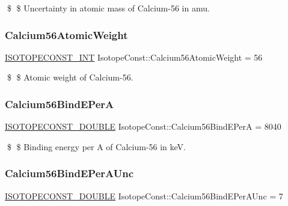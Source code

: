 \$ \$ Uncertainty in atomic mass of Calcium-\/56 in amu. \mbox{\label{group___isotope_const-_calcium-_ca56_ga0a9504d114df0c5ea1c232a277704442}} 
\subsubsection{\texorpdfstring{Calcium56\+Atomic\+Weight}{Calcium56AtomicWeight}}
{\footnotesize\ttfamily \mbox{\hyperlink{group___isotope_const-_macros_ga5f18360b3e99483a35c32d789e62621c}{I\+S\+O\+T\+O\+P\+E\+C\+O\+N\+S\+T\+\_\+\+I\+NT}} Isotope\+Const\+::\+Calcium56\+Atomic\+Weight = 56}

\$ \$ Atomic weight of Calcium-\/56. \mbox{\label{group___isotope_const-_calcium-_ca56_ga6b3adbbc83c3683d8bab47c847dbf985}} 
\subsubsection{\texorpdfstring{Calcium56\+Bind\+E\+PerA}{Calcium56BindEPerA}}
{\footnotesize\ttfamily \mbox{\hyperlink{group___isotope_const-_macros_ga8f45a7272ce02c0b4c65c44636ed719a}{I\+S\+O\+T\+O\+P\+E\+C\+O\+N\+S\+T\+\_\+\+D\+O\+U\+B\+LE}} Isotope\+Const\+::\+Calcium56\+Bind\+E\+PerA = 8040}

\$ \$ Binding energy per A of Calcium-\/56 in keV. \mbox{\label{group___isotope_const-_calcium-_ca56_ga5b426b4ff0e88a3c4710fc9dce39acc3}} 
\subsubsection{\texorpdfstring{Calcium56\+Bind\+E\+Per\+A\+Unc}{Calcium56BindEPerAUnc}}
{\footnotesize\ttfamily \mbox{\hyperlink{group___isotope_const-_macros_ga8f45a7272ce02c0b4c65c44636ed719a}{I\+S\+O\+T\+O\+P\+E\+C\+O\+N\+S\+T\+\_\+\+D\+O\+U\+B\+LE}} Isotope\+Const\+::\+Calcium56\+Bind\+E\+Per\+A\+Unc = 7}

